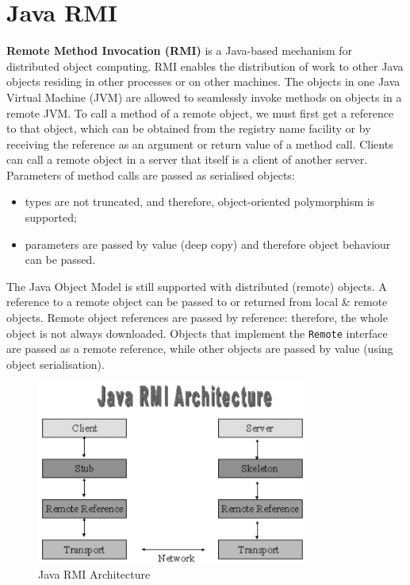 \documentclass[a4paper,11pt]{article}
\begin{document}
\section{Java RMI}
\textbf{Remote Method Invocation (RMI)} is a Java-based mechanism for distributed object computing.
RMI enables the distribution of work to other Java objects residing in other processes or on other machines.
The objects in one Java Virtual Machine (JVM) are allowed to seamlessly invoke methods on objects in a remote JVM.
To call a method of a remote object, we must first get a reference to that object, which can be obtained from  the registry name facility or by receiving the reference as an argument or return value of a method call.
Clients can call a remote object in a server that itself is a client of another server.
Parameters of method calls are passed as serialised objects: 
\begin{itemize}
    \item   types are not truncated, and therefore, object-oriented polymorphism is supported;
    \item   parameters are passed by value (deep copy) and therefore object behaviour can be passed.
\end{itemize}

The Java Object Model is still supported with distributed (remote) objects.
A reference to a remote object can be passed to or returned from local \& remote objects.
Remote object references are passed by reference: therefore, the whole object is not always downloaded.
Objects that implement the \texttt{Remote} interface are passed as a remote reference, while other objects are passed by value (using object serialisation).

\begin{figure}[H]
    \centering
    \includegraphics[width=0.8\textwidth]{./images/javarmi.png}
    \caption{Java RMI Architecture}
\end{figure}
\end{document}
